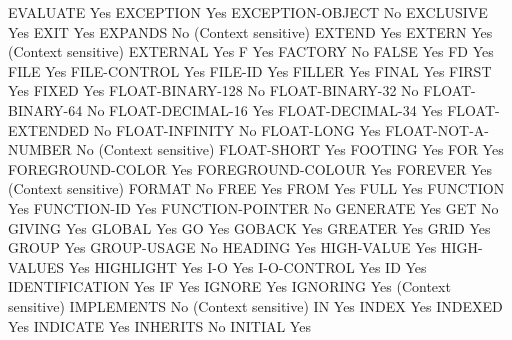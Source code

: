 EVALUATE                        Yes
EXCEPTION                       Yes
EXCEPTION-OBJECT                No
EXCLUSIVE                       Yes
EXIT                            Yes
EXPANDS                         No (Context sensitive)
EXTEND                          Yes
EXTERN                          Yes (Context sensitive)
EXTERNAL                        Yes
F                               Yes
FACTORY                         No
FALSE                           Yes
FD                              Yes
FILE                            Yes
FILE-CONTROL                    Yes
FILE-ID                         Yes
FILLER                          Yes
FINAL                           Yes
FIRST                           Yes
FIXED                           Yes
FLOAT-BINARY-128                No
FLOAT-BINARY-32                 No
FLOAT-BINARY-64                 No
FLOAT-DECIMAL-16                Yes
FLOAT-DECIMAL-34                Yes
FLOAT-EXTENDED                  No
FLOAT-INFINITY                  No
FLOAT-LONG                      Yes
FLOAT-NOT-A-NUMBER              No (Context sensitive)
FLOAT-SHORT                     Yes
FOOTING                         Yes
FOR                             Yes
FOREGROUND-COLOR                Yes
FOREGROUND-COLOUR               Yes
FOREVER                         Yes (Context sensitive)
FORMAT                          No
FREE                            Yes
FROM                            Yes
FULL                            Yes
FUNCTION                        Yes
FUNCTION-ID                     Yes
FUNCTION-POINTER                No
GENERATE                        Yes
GET                             No
GIVING                          Yes
GLOBAL                          Yes
GO                              Yes
GOBACK                          Yes
GREATER                         Yes
GRID                            Yes
GROUP                           Yes
GROUP-USAGE                     No
HEADING                         Yes
HIGH-VALUE                      Yes
HIGH-VALUES                     Yes
HIGHLIGHT                       Yes
I-O                             Yes
I-O-CONTROL                     Yes
ID                              Yes
IDENTIFICATION                  Yes
IF                              Yes
IGNORE                          Yes
IGNORING                        Yes (Context sensitive)
IMPLEMENTS                      No (Context sensitive)
IN                              Yes
INDEX                           Yes
INDEXED                         Yes
INDICATE                        Yes
INHERITS                        No
INITIAL                         Yes

